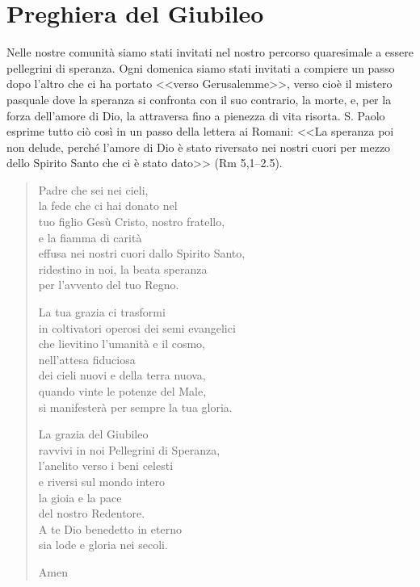 \section{Preghiera del Giubileo}

Nelle nostre comunità siamo stati invitati nel nostro percorso quaresimale a essere pellegrini di speranza. Ogni domenica siamo stati invitati a compiere un passo dopo l'altro che ci ha portato <<verso Gerusalemme>>, verso cioè il mistero pasquale dove la speranza si confronta con il suo contrario, la morte, e, per la forza dell'amore di Dio, la attraversa fino a pienezza di vita risorta. S. Paolo esprime tutto ciò così in un passo della lettera ai Romani: <<La speranza poi non delude, perché l'amore di Dio è stato riversato nei nostri cuori per mezzo dello Spirito Santo che ci è stato dato>> (Rm 5,1--2.5).

\begin{verse}
Padre che sei nei cieli, \\
la fede che ci hai donato nel \\
tuo figlio Gesù Cristo, nostro fratello, \\
e la fiamma di carità \\
effusa nei nostri cuori dallo Spirito Santo, \\
ridestino in noi, la beata speranza \\
per l'avvento del tuo Regno.


La tua grazia ci trasformi \\
in coltivatori operosi dei semi evangelici \\
che lievitino l'umanità e il cosmo, \\
nell'attesa fiduciosa \\
dei cieli nuovi e della terra nuova, \\
quando vinte le potenze del Male, \\
si manifesterà per sempre la tua gloria.


La grazia del Giubileo \\
ravvivi in noi Pellegrini di Speranza, \\
l'anelito verso i beni celesti \\
e riversi sul mondo intero \\
la gioia e la pace \\
del nostro Redentore. \\
A te Dio benedetto in eterno \\
sia lode e gloria nei secoli.

Amen
\end{verse}

